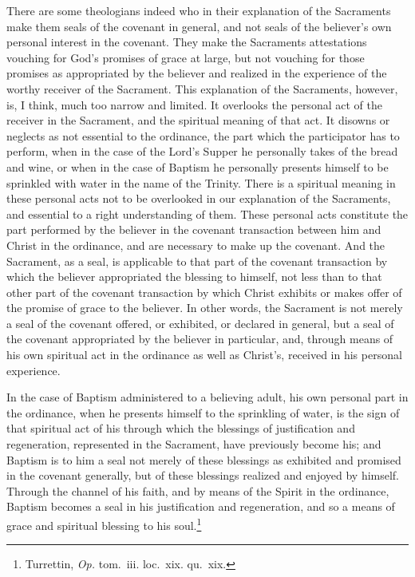 \documentclass[
  english,
]{book}
\begin{document}
There are some theologians indeed who in their explanation of the Sacraments make them seals of the covenant in general, and not seals of the believer's own personal interest in the covenant. They make the Sacraments attestations vouching for God's promises of grace at large, but not vouching for those promises as appropriated by the believer and realized in the experience of the worthy receiver of the Sacrament. This explanation of the Sacraments, however, is, I think, much too narrow and limited. It overlooks the personal act of the receiver in the Sacrament, and the spiritual meaning of that act. It disowns or neglects as not essential to the ordinance, the part which the participator has to perform, when in the case of the Lord's Supper he personally takes of the bread and wine, or when in the case of Baptism he personally presents himself to be sprinkled with water in the name of the Trinity. There is a spiritual meaning in these personal acts not to be overlooked in our explanation of the Sacraments, and essential to a right understanding of them. These personal acts constitute the part performed by the believer in the covenant transaction between him and Christ in the ordinance, and are necessary to make up the covenant. And the Sacrament, as a seal, is applicable to that part of the covenant transaction by which the believer appropriated the blessing to himself, not less than to that other part of the covenant transaction by which Christ exhibits or makes offer of the promise of grace to the believer. In other words, the Sacrament is not merely a seal of the covenant offered, or exhibited, or declared in general, but a seal of the covenant appropriated by the believer in particular, and, through means of his own spiritual act in the ordinance as well as Christ's, received in his personal experience.

In the case of Baptism administered to a believing adult, his own personal part in the ordinance, when he presents himself to the sprinkling of water, is the sign of that spiritual act of his through which the blessings of justification and regeneration, represented in the Sacrament, have previously become his; and Baptism is to him a seal not merely of these blessings as exhibited and promised in the covenant generally, but of these blessings realized and enjoyed by himself. Through the channel of his faith, and by means of the Spirit in the ordinance, Baptism becomes a seal in his justification and regeneration, and so a means of grace and spiritual blessing to his soul.\footnote{Turrettin, \emph{Op.} tom.~iii. loc.~xix. qu.~xix.}
\end{document}
